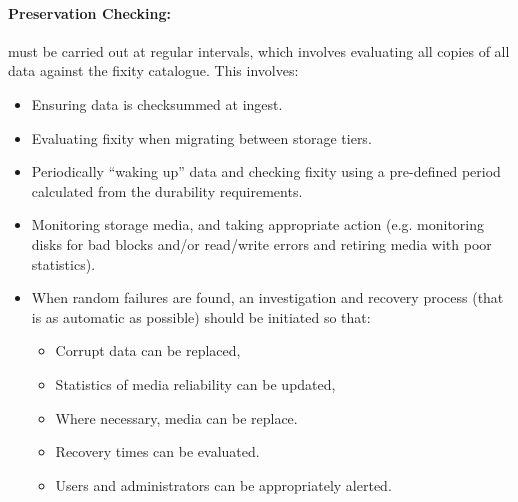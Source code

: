 \paragraph{Preservation Checking:} must be carried out at regular intervals,
which involves evaluating all copies of all data against the fixity catalogue.
This involves:
  \begin{itemize}
  \item Ensuring data is checksummed at ingest.
  \item Evaluating fixity when migrating between storage tiers.
  \item Periodically ``waking up'' data and checking fixity using a pre-defined
  period calculated from the durability requirements.
  \item Monitoring storage media, and taking appropriate action (e.g. monitoring
  disks for bad blocks and/or read/write errors and retiring media with poor
  statistics).
  \item When random failures are found, an investigation and recovery process (that
  is as automatic as possible) should be initiated so that:
  \begin{itemize}
      \item Corrupt data can be replaced,
      \item Statistics of media reliability can be updated,
      \item Where necessary, media can be replace.
      \item Recovery times can be evaluated.
      \item Users and administrators can be appropriately alerted.
  \end{itemize}
  \end{itemize}
